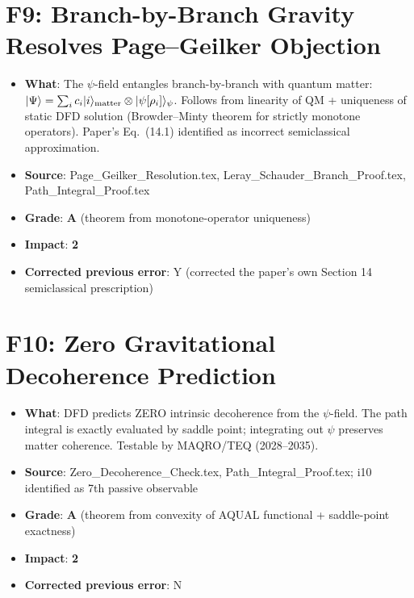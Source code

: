 \documentclass[11pt,a4paper]{article}
\newcommand{\grade}[1]{\textbf{#1}}
\newcommand{\impact}[1]{\textbf{#1}}
\begin{document}
\section{F9: Branch-by-Branch Gravity Resolves Page--Geilker Objection}
\begin{itemize}[nosep]
\item \textbf{What}: The $\psi$-field entangles branch-by-branch with quantum matter: $|\Psi\rangle = \sum_i c_i |i\rangle_{\rm matter} \otimes |\psi[\rho_i]\rangle_\psi$. Follows from linearity of QM + uniqueness of static DFD solution (Browder--Minty theorem for strictly monotone operators). Paper's Eq.~(14.1) identified as incorrect semiclassical approximation.
\item \textbf{Source}: Page\_Geilker\_Resolution.tex, Leray\_Schauder\_Branch\_Proof.tex, Path\_Integral\_Proof.tex
\item \textbf{Grade}: \grade{A} (theorem from monotone-operator uniqueness)
\item \textbf{Impact}: \impact{2}
\item \textbf{Corrected previous error}: Y (corrected the paper's own Section 14 semiclassical prescription)
\end{itemize}

\section{F10: Zero Gravitational Decoherence Prediction}
\begin{itemize}[nosep]
\item \textbf{What}: DFD predicts ZERO intrinsic decoherence from the $\psi$-field. The path integral is exactly evaluated by saddle point; integrating out $\psi$ preserves matter coherence. Testable by MAQRO/TEQ (2028--2035).
\item \textbf{Source}: Zero\_Decoherence\_Check.tex, Path\_Integral\_Proof.tex; i10 identified as 7th passive observable
\item \textbf{Grade}: \grade{A} (theorem from convexity of AQUAL functional + saddle-point exactness)
\item \textbf{Impact}: \impact{2}
\item \textbf{Corrected previous error}: N
\end{itemize}
\end{document}
